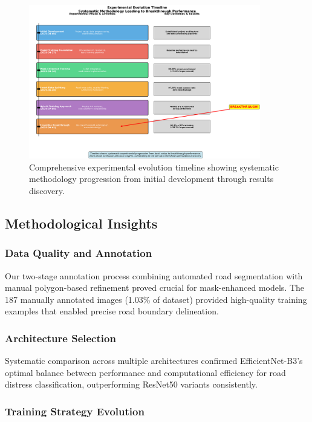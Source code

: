 \documentclass[12pt]{article}
\begin{document}
\begin{figure}[!htb]
\centering
\includegraphics[width=0.9\textwidth]{images/experimental_timeline_detailed.png}
\caption{Comprehensive experimental evolution timeline showing systematic methodology progression from initial development through results discovery.}
\end{figure}

\subsection{Methodological Insights}

\subsubsection{Data Quality and Annotation}

Our two-stage annotation process combining automated road segmentation with manual polygon-based refinement proved crucial for mask-enhanced models. The 187 manually annotated images (1.03\% of dataset) provided high-quality training examples that enabled precise road boundary delineation.

\subsubsection{Architecture Selection}

Systematic comparison across multiple architectures confirmed EfficientNet-B3's optimal balance between performance and computational efficiency for road distress classification, outperforming ResNet50 variants consistently.

\subsubsection{Training Strategy Evolution}
\end{document}
